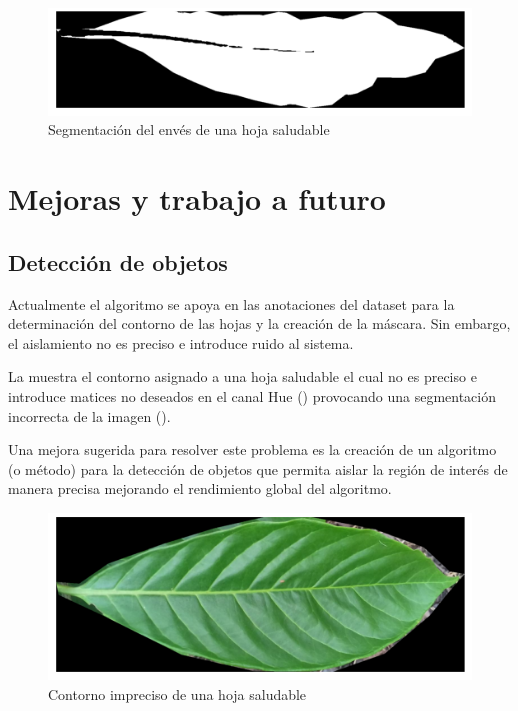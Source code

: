\begin{figure}[H]
\centering
\includegraphics[scale=1]{images/special_case_backbone_binary.png}
\caption{Segmentación del envés de una hoja saludable}
\label{img:backbone_binary}
\end{figure}

\section{Mejoras y trabajo a futuro}

\subsection{Detección de objetos}
Actualmente el algoritmo se apoya en las anotaciones del dataset para la determinación del contorno de las hojas y la creación de la máscara. Sin embargo, el aislamiento no es preciso e introduce ruido al sistema.

La  muestra el contorno asignado a una hoja saludable el cual no es preciso e introduce matices no deseados en el canal Hue () provocando una segmentación incorrecta de la imagen ().

Una mejora sugerida para resolver este problema es la creación de un algoritmo (o método) para la detección de objetos que permita aislar la región de interés de manera precisa mejorando el rendimiento global del algoritmo.

\begin{figure}[H]
\centering
\includegraphics[scale=1]{images/consideration_contour_rgb.png}
\caption{Contorno impreciso de una hoja saludable}
\label{img:issue_countour_rgb}
\end{figure}

